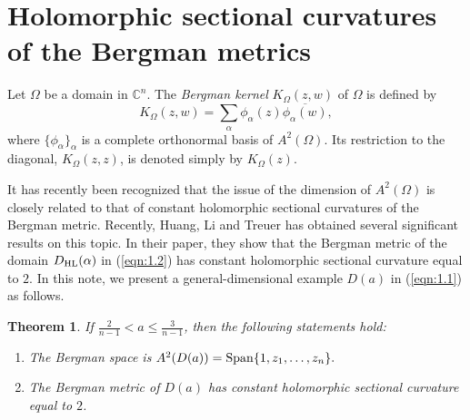 \documentclass[12pt]{amsart}
\numberwithin{equation}{section}
\newtheorem{theorem}{Theorem}[section]
\theoremstyle{definition}
\theoremstyle{remark}
\newcommand{\C}{{\mathbb C}}
\newcommand{\1}{{\bf 1}}
\begin{document}
\section{Holomorphic sectional curvatures 
of the Bergman metrics}



Let $\Omega$ be a domain in $\C^n$. 
The {\it Bergman kernel} $K_{\Omega}(z,w)$ of $\Omega$ 
is defined by 
$$
K_{\Omega}(z,w)=\sum_{\alpha} 
\phi_{\alpha}(z) \overline{\phi_{\alpha}(w)},
$$ 
where $\{\phi_{\alpha}\}_{\alpha}$ is a complete orthonormal 
basis of $A^2(\Omega)$.  
Its restriction to the diagonal, $K_{\Omega}(z,z)$,  
is denoted simply by $K_{\Omega}(z)$. 

It has recently been recognized 
that the issue of the dimension of $A^2(\Omega)$ is
closely related to that of 
constant holomorphic sectional curvatures
of the Bergman metric. 
Recently, 
Huang, Li and Treuer \cite{HLT25} has obtained 
several significant results on this topic.
In their paper, they show that the Bergman metric 
of the domain $D_{\rm HL}(\alpha)$ 
in (\ref{eqn:1.2}) has constant holomorphic 
sectional curvature equal to $2$. 
In this note, we present 
a general-dimensional example $D(a)$  in (\ref{eqn:1.1}) 
as follows. 

\begin{theorem}
If 
$\frac{2}{n-1}<a\leq\frac{3}{n-1}$,
then the following statements hold: 
\begin{enumerate}
\item
The Bergman space is 
$A^2(D(a))={\rm Span}\{1,z_1,\ldots,z_n\}.$
\item
The Bergman metric of $D(a)$ has constant 
holomorphic sectional curvature equal to $2$.
\end{enumerate}
\end{theorem}
\end{document}
